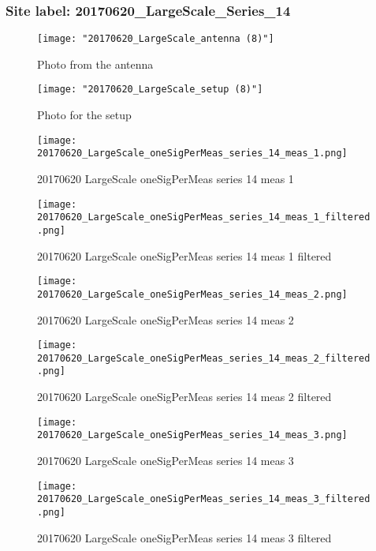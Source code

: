 \subsubsection{Site label: 20170620\_LargeScale\_Series\_14}
\begin{figure}[ht] \caption{Photo from the antenna}
\texttt{[image: "20170620\_LargeScale\_antenna (8)"]}\centering\end{figure}
\begin{figure}[ht] \caption{Photo for the setup}
\texttt{[image: "20170620\_LargeScale\_setup (8)"]}\centering\end{figure}
\begin{figure}[ht] \caption{20170620 LargeScale oneSigPerMeas series 14 meas 1}
\texttt{[image: 20170620\_LargeScale\_oneSigPerMeas\_series\_14\_meas\_1.png]}\centering\end{figure}
\begin{figure}[ht] \caption{20170620 LargeScale oneSigPerMeas series 14 meas 1 filtered}
\texttt{[image: 20170620\_LargeScale\_oneSigPerMeas\_series\_14\_meas\_1\_filtered.png]}\centering\end{figure}
\begin{figure}[ht] \caption{20170620 LargeScale oneSigPerMeas series 14 meas 2}
\texttt{[image: 20170620\_LargeScale\_oneSigPerMeas\_series\_14\_meas\_2.png]}\centering\end{figure}
\begin{figure}[ht] \caption{20170620 LargeScale oneSigPerMeas series 14 meas 2 filtered}
\texttt{[image: 20170620\_LargeScale\_oneSigPerMeas\_series\_14\_meas\_2\_filtered.png]}\centering\end{figure}
\begin{figure}[ht] \caption{20170620 LargeScale oneSigPerMeas series 14 meas 3}
\texttt{[image: 20170620\_LargeScale\_oneSigPerMeas\_series\_14\_meas\_3.png]}\centering\end{figure}
\begin{figure}[ht] \caption{20170620 LargeScale oneSigPerMeas series 14 meas 3 filtered}
\texttt{[image: 20170620\_LargeScale\_oneSigPerMeas\_series\_14\_meas\_3\_filtered.png]}\centering\end{figure}
\clearpage
